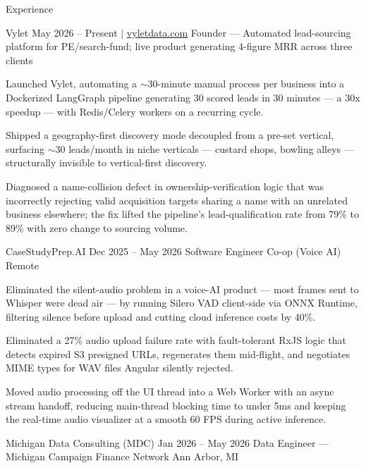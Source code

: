 \documentclass[
	11pt
]{../../../template}
\begin{document}
	\begin{rSection}{E}{xperience}
		\begin{rSectionEntry}
			{Vylet}
			{May 2026 -- Present $\vert$ \href{https://vyletdata.com}{vyletdata.com}}
			{Founder --- Automated lead-sourcing platform for PE/search-fund; live product generating 4-figure MRR across three clients}
			{}
			{}

			\item Launched Vylet, automating a $\sim$30-minute manual process per business into a Dockerized LangGraph pipeline generating 30 scored leads in 30 minutes --- a 30x speedup --- with Redis/Celery workers on a recurring cycle.
			\item Shipped a geography-first discovery mode decoupled from a pre-set vertical, surfacing $\sim$30 leads/month in niche verticals --- custard shops, bowling alleys --- structurally invisible to vertical-first discovery.
			\item Diagnosed a name-collision defect in ownership-verification logic that was incorrectly rejecting valid acquisition targets sharing a name with an unrelated business elsewhere; the fix lifted the pipeline's lead-qualification rate from 79\% to 89\% with zero change to sourcing volume.
		\end{rSectionEntry}

		\begin{rSectionEntry}
			{CaseStudyPrep.AI}
			{Dec 2025 -- May 2026}
			{Software Engineer Co-op (Voice AI)}
			{}
			{Remote}

			\item Eliminated the silent-audio problem in a voice-AI product --- most frames sent to Whisper were dead air --- by running Silero VAD client-side via ONNX Runtime, filtering silence before upload and cutting cloud inference costs by 40\%.
			\item Eliminated a 27\% audio upload failure rate with fault-tolerant RxJS logic that detects expired S3 presigned URLs, regenerates them mid-flight, and negotiates MIME types for WAV files Angular silently rejected.
			\item Moved audio processing off the UI thread into a Web Worker with an async stream handoff, reducing main-thread blocking time to under 5ms and keeping the real-time audio visualizer at a smooth 60 FPS during active inference.
		\end{rSectionEntry}

		\begin{rSectionEntry}
			{Michigan Data Consulting (MDC)}
			{Jan 2026 -- May 2026}
			{Data Engineer --- Michigan Campaign Finance Network}
			{}
			{Ann Arbor, MI}


\end{rSectionEntry}
\end{rSection}
\end{document}
